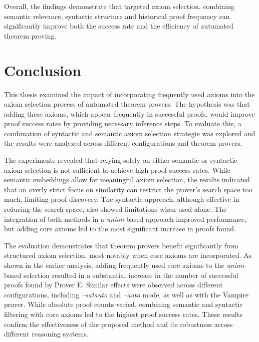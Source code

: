 \documentclass[english,version-2020-11]{uzl-thesis}
\begin{document}
Overall, the findings demonstrate that targeted axiom selection, combining semantic relevance, syntactic structure and historical proof frequency can significantly improve both the success rate and the efficiency of automated theorem proving.




\chapter{Conclusion}
\label{chapter-conclusion}
This thesis examined the impact of incorporating frequently used axioms into the axiom selection process of automated theorem provers. The hypothesis was that adding these axioms, which appear frequently in successful proofs, would improve proof success rates by providing necessary inference steps. To evaluate this, a combination of syntactic and semantic axiom selection strategie was explored and the results were analyzed across different configurations and theorem provers.

The experiments revealed that relying solely on either semantic or syntactic axiom selection is not sufficient to achieve high proof success rates. While semantic embeddings allow for meaningful axiom selection, the results indicated that an overly strict focus on similarity can restrict the prover’s search space too much, limiting proof discovery. The syntactic approach, although effective in reducing the search space, also showed limitations when used alone. The integration of both methods in a \textit{union}-based approach improved performance, but adding core axioms led to the most significant increase in proofs found.

The evaluation demonstrates that theorem provers benefit significantly from structured axiom selection, most notably when core axioms are incorporated. As shown in the earlier analysis, adding frequently used core axioms to the \textit{union}-based selection resulted in a substantial increase in the number of successful proofs found by Prover E. Similar effects were observed across different configurations, including \textit{--satauto} and \textit{--auto} mode, as well as with the Vampire prover. While absolute proof counts varied, combining semantic and syntactic filtering with core axioms led to the highest proof success rates. These results confirm the effectiveness of the proposed method and its robustness across different reasoning systems.
\end{document}
